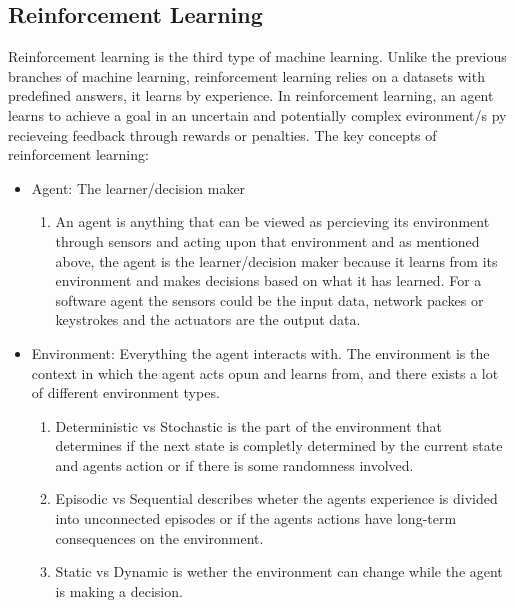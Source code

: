 \subsection{Reinforcement Learning}
Reinforcement learning is the third type of machine learning.
Unlike the previous branches of machine learning,
reinforcement learning relies on a datasets with predefined answers, it learns by experience.
In reinforcement learning, an agent learns to achieve a goal in
an uncertain and potentially complex evironment/s py recieveing feedback
through rewards or penalties. \cite{RL-GeeksForGeeks}
\newline
The key concepts of reinforcement learning:

\begin{itemize}
      \item Agent: The learner/decision maker
            \begin{enumerate}
                  \item An agent is anything that can be viewed as percieving its environment through
                        sensors and acting upon that environment and as mentioned above, the agent is the learner/decision maker because it
                        learns from its environment and makes decisions based on what it has learned.
                        For a software agent the sensors could be the input data, network packes or keystrokes
                        and the actuators are the output data. \cite{IntelligentAgents}
            \end{enumerate}
      \item Environment: Everything the agent interacts with. The environment is the context in which the agent acts opun and learns from,
            and there exists a lot of different environment types. \cite{IntelligentAgents}
            \begin{enumerate}
                  \item Deterministic vs Stochastic is the part of the environment that determines if the next state is completly
                        determined by the current state and agents action or if there is some randomness involved.
                  \item Episodic vs Sequential describes wheter the agents experience is divided into unconnected episodes or
                        if the agents actions have long-term consequences on the environment.
                  \item Static vs Dynamic is wether the environment can change while the agent is making a decision.

\end{enumerate}
\end{itemize}

